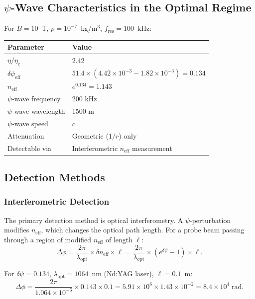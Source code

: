 \documentclass[11pt,a4paper]{article}
\begin{document}
\subsection{$\psi$-Wave Characteristics in the Optimal Regime}

For $B = 10$~T, $\rho = 10^{-7}$~kg/m$^3$, $f_{\mathrm{res}} = 100$~kHz:

\begin{center}
\begin{tabular}{ll}
\toprule
\textbf{Parameter} & \textbf{Value} \\
\midrule
$\eta/\eta_c$ & 2.42 \\
$\delta\psi_{\mathrm{eff}}$ & $51.4 \times (4.42 \times 10^{-3} - 1.82 \times 10^{-3}) = 0.134$ \\
$n_{\mathrm{eff}}$ & $e^{0.134} = 1.143$ \\
$\psi$-wave frequency & 200 kHz \\
$\psi$-wave wavelength & 1500 m \\
$\psi$-wave speed & $c$ \\
Attenuation & Geometric ($1/r$) only \\
Detectable via & Interferometric $n_{\mathrm{eff}}$ measurement \\
\bottomrule
\end{tabular}
\end{center}

\subsection{Detection Methods}

\subsubsection{Interferometric Detection}

The primary detection method is optical interferometry. A $\psi$-perturbation modifies
$n_{\mathrm{eff}}$, which changes the optical path length. For a probe beam passing
through a region of modified $n_{\mathrm{eff}}$ of length $\ell$:
\begin{equation}
\Delta\phi = \frac{2\pi}{\lambda_{\mathrm{opt}}} \times \delta n_{\mathrm{eff}} \times \ell
= \frac{2\pi}{\lambda_{\mathrm{opt}}} \times (e^{\delta\psi} - 1) \times \ell.
\end{equation}

For $\delta\psi = 0.134$, $\lambda_{\mathrm{opt}} = 1064$~nm (Nd:YAG laser),
$\ell = 0.1$~m:
\begin{equation}
\Delta\phi = \frac{2\pi}{1.064 \times 10^{-6}} \times 0.143 \times 0.1
= 5.91 \times 10^6 \times 1.43 \times 10^{-2} = 8.4 \times 10^4\;\mathrm{rad}.
\end{equation}
\end{document}

